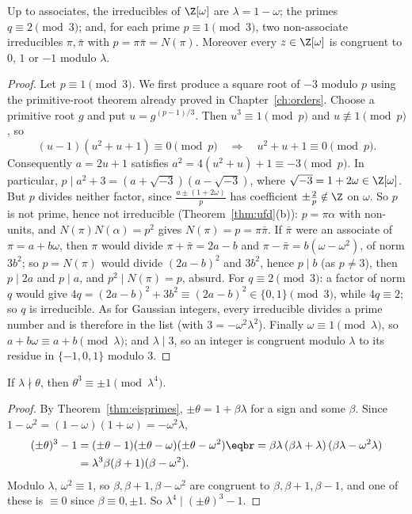 \begin{theorem}\label{thm:eisprimes}
Up to associates, the irreducibles of $\Z[\omega]$ are $\lambda=1-\omega$; the primes $q\equiv2\pmod3$; and, for each prime $p\equiv1\pmod3$, two non-associate irreducibles $\pi,\bar\pi$ with $p=\pi\bar\pi=N(\pi)$. Moreover every $z\in\Z[\omega]$ is congruent to $0$, $1$ or $-1$ modulo $\lambda$.
\end{theorem}
\begin{proof}
Let $p\equiv1\pmod3$. We first produce a square root of $-3$ modulo $p$ using the primitive-root theorem already proved in Chapter~\ref{ch:orders}. Choose a primitive root $g$ and put $u=g^{(p-1)/3}$. Then $u^3\equiv1\pmod p$ and $u\not\equiv1\pmod p$, so
\[
(u-1)(u^2+u+1)\equiv0\pmod p
\quad\Longrightarrow\quad u^2+u+1\equiv0\pmod p.
\]
Consequently $a=2u+1$ satisfies $a^2=4(u^2+u)+1\equiv-3\pmod p$. In particular, $p\mid a^2+3=(a+\sqrt{-3})(a-\sqrt{-3})$, where $\sqrt{-3}=1+2\omega\in\Z[\omega]$. But $p$ divides neither factor, since $\frac{a\pm(1+2\omega)}p$ has coefficient $\pm\frac2p\notin\Z$ on $\omega$. So $p$ is not prime, hence not irreducible (Theorem~\ref{thm:ufd}(b)): $p=\pi\alpha$ with non-units, and $N(\pi)N(\alpha)=p^2$ gives $N(\pi)=p=\pi\bar\pi$. If $\bar\pi$ were an associate of $\pi=a+b\omega$, then $\pi$ would divide $\pi+\bar\pi=2a-b$ and $\pi-\bar\pi=b(\omega-\omega^2)$, of norm $3b^2$; so $p=N(\pi)$ would divide $(2a-b)^2$ and $3b^2$, hence $p\mid b$ (as $p\ne3$), then $p\mid2a$ and $p\mid a$, and $p^2\mid N(\pi)=p$, absurd. For $q\equiv2\pmod3$: a factor of norm $q$ would give $4q=(2a-b)^2+3b^2\equiv(2a-b)^2\in\{0,1\}\pmod3$, while $4q\equiv2$; so $q$ is irreducible. As for Gaussian integers, every irreducible divides a prime number and is therefore in the list (with $3=-\omega^2\lambda^2$).
Finally $\omega\equiv1\pmod\lambda$, so $a+b\omega\equiv a+b\pmod\lambda$; and $\lambda\mid3$, so an integer is congruent modulo $\lambda$ to its residue in $\{-1,0,1\}$ modulo $3$.
\end{proof}

\begin{lemma}\label{lem:cube}
If $\lambda\nmid\theta$, then $\theta^3\equiv\pm1\pmod{\lambda^4}$.
\end{lemma}
\begin{proof}
By Theorem~\ref{thm:eisprimes}, $\pm\theta=1+\beta\lambda$ for a sign and some $\beta$. Since $1-\omega^2=(1-\omega)(1+\omega)=-\omega^2\lambda$,
\[
\begin{aligned}(\pm\theta)^3-1&=(\pm\theta-1)(\pm\theta-\omega)(\pm\theta-\omega^2)\eqbr=\beta\lambda\,(\beta\lambda+\lambda)\,(\beta\lambda-\omega^2\lambda)\\&=\lambda^3\beta(\beta+1)(\beta-\omega^2).\end{aligned}
\]
Modulo $\lambda$, $\omega^2\equiv1$, so $\beta,\beta+1,\beta-\omega^2$ are congruent to $\beta,\beta+1,\beta-1$, and one of these is $\equiv0$ since $\beta\equiv0,\pm1$. So $\lambda^4\mid(\pm\theta)^3-1$.
\end{proof}


